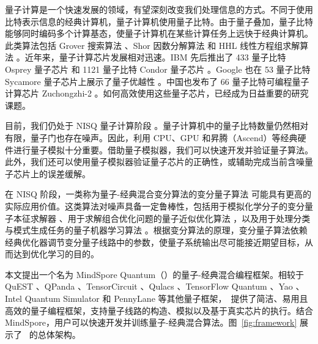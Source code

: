 量子计算是一个快速发展的领域，有望深刻改变我们处理信息的方式。不同于使用比特表示信息的经典计算机，量子计算机使用量子比特。由于量子叠加，量子比特能够同时编码多个计算基态，使量子计算机在某些计算任务上远快于经典计算机。此类算法包括 Grover 搜索算法 \cite{grover1996fast, long2001grover}、Shor 因数分解算法 \cite{shor1994algorithms} 和 HHL 线性方程组求解算法 \cite{harrow2009quantum}。近年来，量子计算芯片发展相对迅速。IBM 先后推出了 433 量子比特 Osprey 量子芯片 \cite{ibm2022osprey} 和 1121 量子比特 Condor 量子芯片 \cite{castelvecchi2023ibm}。Google 也在 53 量子比特 Sycamore 量子芯片上展示了量子优越性 \cite{arute2019quantum}。中国也发布了 66 量子比特可编程量子计算芯片 Zuchongzhi-2 \cite{wu2021strong}。如何高效使用这些量子芯片，已经成为日益重要的研究课题。

目前，我们仍处于 NISQ 量子计算阶段 \cite{preskill2018quantum}。量子计算机中的量子比特数量仍然相对有限，量子门也存在噪声。因此，利用 CPU、GPU 和昇腾（Ascend）等经典硬件进行量子模拟十分重要。借助量子模拟器，我们可以快速开发并验证量子算法。此外，我们还可以使用量子模拟器验证量子芯片的正确性，或辅助完成当前含噪量子芯片上的误差缓解。

在 NISQ 阶段，一类称为量子-经典混合变分算法的变分量子算法 \cite{Peruzzo2014Peruzzo2014,cerezo2021variational,PhysRevA.109.052414} 可能具有更高的实际应用价值。这类算法对噪声具备一定鲁棒性，包括用于模拟化学分子的变分量子本征求解器 \cite{mcardle2020quantum,cao2019quantum,yeter2020practical,fan2023circuit}、用于求解组合优化问题的量子近似优化算法 \cite{farhi2014quantum,PhysRevResearch.4.013141}，以及用于处理分类与模式生成任务的量子机器学习算法 \cite{benedetti2019parameterized,biamonte2017quantum,das2019machine,PhysRevResearch.6.013027}。根据变分算法的原理，变分量子算法依赖经典优化器调节变分量子线路中的参数，使量子系统输出尽可能接近期望目标，从而达到优化学习的目的。

本文提出一个名为 MindSpore Quantum（\MindQuantum）的量子-经典混合编程框架。相较于 QuEST \cite{jones2019quest}、QPanda \cite{dou2022qpanda}、TensorCircuit \cite{zhang2023tensorcircuit}、Qulacs \cite{suzuki2021qulacs}、TensorFlow Quantum \cite{broughton2020tensorflow}、Yao \cite{luo2020yao}、Intel Quantum Simulator \cite{guerreschi2020intel} 和 PennyLane \cite{bergholm2018pennylane} 等其他量子框架，\MindQuantum\ 提供了简洁、易用且高效的量子编程框架，支持量子线路的构造、模拟以及基于真实芯片的执行。结合 MindSpore，用户可以快速开发并训练量子-经典混合算法。图~\ref{fig:framework} 展示了 \MindQuantum\ 的总体架构。

